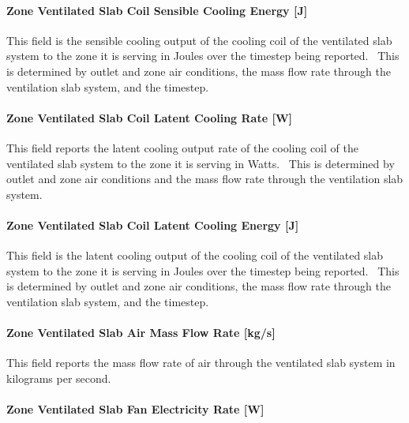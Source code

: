 \paragraph{Zone Ventilated Slab Coil Sensible Cooling Energy {[}J{]}}\label{zone-ventilated-slab-coil-sensible-cooling-energy-j}

This field is the sensible cooling output of the cooling coil of the ventilated slab system to the zone it is serving in Joules over the timestep being reported.~ This is determined by outlet and zone air conditions, the mass flow rate through the ventilation slab system, and the timestep.

\paragraph{Zone Ventilated Slab Coil Latent Cooling Rate {[}W{]}}\label{zone-ventilated-slab-coil-latent-cooling-rate-w}

This field reports the latent cooling output rate of the cooling coil of the ventilated slab system to the zone it is serving in Watts.~ This is determined by outlet and zone air conditions and the mass flow rate through the ventilation slab system.

\paragraph{Zone Ventilated Slab Coil Latent Cooling Energy {[}J{]}}\label{zone-ventilated-slab-coil-latent-cooling-energy-j}

This field is the latent cooling output of the cooling coil of the ventilated slab system to the zone it is serving in Joules over the timestep being reported.~ This is determined by outlet and zone air conditions, the mass flow rate through the ventilation slab system, and the timestep.

\paragraph{Zone Ventilated Slab Air Mass Flow Rate {[}kg/s{]}}\label{zone-ventilated-slab-air-mass-flow-rate-kgs}

This field reports the mass flow rate of air through the ventilated slab system in kilograms per second.

\paragraph{Zone Ventilated Slab Fan Electricity Rate {[}W{]}}\label{zone-ventilated-slab-fan-electric-power-w}

